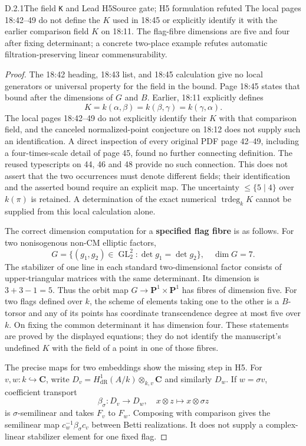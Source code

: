 \begin{result}{D.2.1}{The field \texttt{K} and Lead H5}{Source gate; H5 formulation refuted}
The local pages 18:42--49 do not define the $K$ used in 18:45 or explicitly identify it with the earlier comparison field $K$ on 18:11. The flag-fibre dimensions are five and four after fixing determinant; a concrete two-place example refutes automatic filtration-preserving linear commensurability.
\end{result}
\begin{proof}
The 18:42 heading, 18:43 list, and 18:45 calculation give no local
generators or universal property for the field in the bound. Page 18:45
states that bound after the dimensions of \(G\) and \(B\). Earlier,
18:11 explicitly defines
\[
 K=k(\alpha,\beta)=k(\beta,\gamma)=k(\gamma,\alpha).
\]
The local pages 18:42--49 do not explicitly identify their \(K\) with
that comparison field, and the canceled normalized-point conjecture
on 18:12 does not supply such an identification. A direct inspection
of every original PDF page 42--49, including a four-times-scale detail
of page 45, found no further connecting definition. The reused
typescripts on 44, 46 and 48 provide no such connection. This does
not assert that the two occurrences must denote different fields;
their identification and the asserted bound require an explicit map.
The uncertainty \(\leq\{5\mid4\}\) over \(k(\pi)\) is retained.
A determination of the exact numerical \(\operatorname{trdeg}_kK\)
cannot be supplied from this local calculation alone.

The correct dimension computation for a \textbf{specified flag fibre} is
as follows. For two nonisogenous non-CM elliptic factors,
\[
G=\{(g_1,g_2)\in\operatorname{GL}_2^2:
\det g_1=\det g_2\},\quad\dim G=7.
\]
The stabilizer of one line in each standard two-dimensional factor
consists of upper-triangular matrices with the same determinant. Its
dimension is \(3+3-1=5\). Thus the orbit map
\(G\to\mathbf P^1\times\mathbf P^1\) has fibres of dimension five.
For two flags defined over \(k\), the scheme of elements taking one
to the other is a \(B\)-torsor and any of its points has coordinate
transcendence degree at most five over \(k\). On fixing the common
determinant it has dimension four. These statements are proved by
the displayed equations; they do not identify the manuscript's
undefined \(K\) with the field of a point in one of those fibres.

The precise maps for two embeddings show the missing step in H5.
For \(v,w:k\hookrightarrow\mathbf C\), write
\(D_v=H^1_{\mathrm{dR}}(A/k)\otimes_{k,v}\mathbf C\) and similarly
\(D_w\). If \(w=\sigma v\), coefficient transport
\[
\beta_\sigma:D_v\longrightarrow D_w,\quad x\otimes z\longmapsto
x\otimes\sigma z
\]
is \(\sigma\)-semilinear and takes \(F_v\) to \(F_w\).
Composing with comparison gives the semilinear map
\(c_w^{-1}\beta_\sigma c_v\) between Betti realizations. It does
not supply a complex-linear stabilizer element for one fixed flag.


\end{proof}
